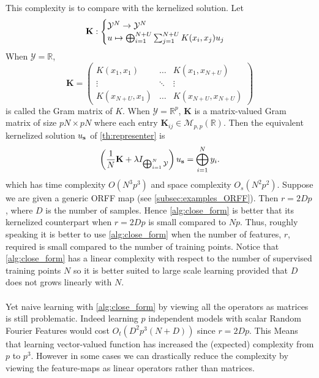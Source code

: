 This complexity is to compare with the kernelized solution. Let
\begin{dmath*}
    \mathbf{K}:
    \begin{cases}
        \mathcal{Y}^{N} \to \mathcal{Y}^{N} \\
        u\mapsto\Vect_{i=1}^{N+U}\sum_{j=1}^{N+U}K(x_i, x_j)u_j
    \end{cases}
\end{dmath*}
When $\mathcal{Y}=\mathbb{R}$,
\begin{dmath*}
    \mathbf{K}=
    \begin{pmatrix} K(x_1, x_1) & \hdots & K(x_1, x_{N+U}) \\ \vdots
        & \ddots & \vdots \\  K(x_{N+U}, x_1) & \hdots & K(x_{N+U}, x_{N+U})
    \end{pmatrix}
\end{dmath*}
is called the Gram matrix of $K$. When $\mathcal{Y}=\mathbb{R}^p$, $\mathbf{K}$
is a matrix-valued Gram matrix of size $pN\times pN$ where each entry
$\mathbf{K}_{ij}\in\mathcal{M}_{p,p}(\mathbb{R})$. Then the equivalent
kernelized solution $u_{\boldsymbol{\mathbf{s}}}$ of \cref{th:representer} is
\begin{dmath*}
    \left(\frac{1}{N} \mathbf{K}  + \lambda
    I_{\Vect_{i=1}^{N}\mathcal{Y}}\right)u_{\seq{s}}=\Vect_{i=1}^N y_i.
\end{dmath*}
which has time complexity $O\left(N^3p^3\right)$ and space complexity
$O_s\left(N^2p^2\right)$. Suppose we are given a generic \acs{ORFF} map (see
\cref{subsec:examples_ORFF}). Then $r=2Dp$, where $D$ is the number of samples.
Hence \cref{alg:close_form} is better that its kernelized counterpart when
$r=2Dp$ is small compared to $Np$. Thus, roughly speaking it is better to use
\cref{alg:close_form} when the number of features, $r$, required is small
compared to the number of training points. Notice that \cref{alg:close_form}
has a linear complexity with respect to the number of supervised training
points $N$ so it is better suited to large scale learning provided that $D$
does not grows linearly with $N$.
\paragraph{}
Yet naive learning with \cref{alg:close_form} by viewing all the operators as
matrices is still problematic. Indeed learning $p$ independent models with
scalar Random Fourier Features would cost $O_t\left(D^2p^3(N + D)\right)$ since
$r=2Dp$. This Means that learning vector-valued function has increased the
(expected) complexity from $p$ to $p^3$. However in some cases we can
drastically reduce the complexity by viewing the feature-maps as linear
operators rather than matrices.

